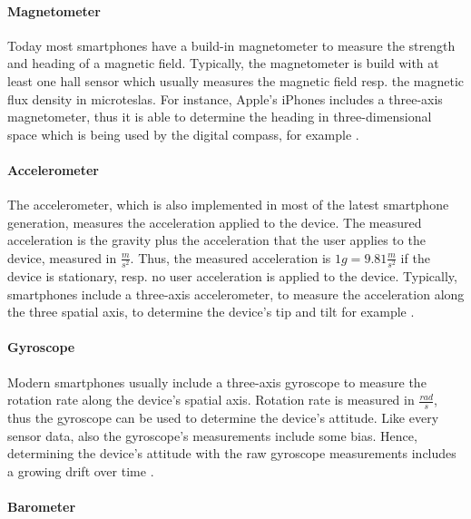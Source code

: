 \paragraph{Magnetometer}

Today most smartphones have a build-in magnetometer to measure the strength and heading of a magnetic field.
Typically, the magnetometer is build with at least one hall sensor which usually measures the magnetic field resp. the magnetic flux density in microteslas.
For instance, Apple's iPhones includes a three-axis magnetometer, thus it is able to determine the heading in three-dimensional space which is being used by the digital compass, for example \cite{ios_cm, wwdc_2012}.


\paragraph{Accelerometer}

The accelerometer, which is also implemented in most of the latest smartphone generation, measures the acceleration applied to the device.
The measured acceleration is the gravity plus the acceleration that the user applies to the device, measured in $\frac{m}{s^2}$.
Thus, the measured acceleration is $1g = 9.81 \frac{m}{s^2}$ if the device is stationary, resp. no user acceleration is applied to the device.
Typically, smartphones include a three-axis accelerometer, to measure the acceleration along the three spatial axis, to determine the device's tip and tilt for example \cite{ios_cm, wwdc_2012}.

\paragraph{Gyroscope}

Modern smartphones usually include a three-axis gyroscope to measure the rotation rate along the device's spatial axis.
Rotation rate is measured in $\frac{rad}{s}$, thus the gyroscope can be used to determine the device's attitude.
Like every sensor data, also the gyroscope's measurements include some bias.
Hence, determining the device's attitude with the raw gyroscope measurements includes a growing drift over time \cite{ios_cm, wwdc_2012}.


\paragraph{Barometer}

